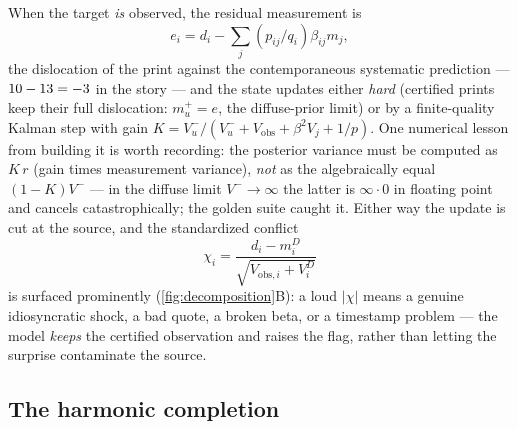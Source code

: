 \documentclass[11pt]{article}
\begin{document}
When the target \emph{is} observed, the residual measurement is
\begin{equation}
e_i=d_i-\textstyle\sum_j (p_{ij}/q_i)\beta_{ij} m_j,
\label{eq:resmeas}
\end{equation}
the dislocation of the print against the contemporaneous systematic
prediction --- $10-13=-3$ in the story --- and the state
updates either \emph{hard} (certified prints keep their full dislocation:
$m_u^+=e$, the diffuse-prior limit) or by a finite-quality Kalman step
with gain $K=V_u^-/(V_u^-+V_{\mathrm{obs}}+\beta^2V_j+1/p)$.  One
numerical lesson from building it is worth recording: the posterior
variance must be computed as $K\,r$ (gain times measurement variance),
\emph{not} as the algebraically equal $(1-K)V^-$ --- in the diffuse limit
$V^-\to\infty$ the latter is $\infty\cdot0$ in floating point and
cancels catastrophically; the golden suite caught it.  Either way the
update is cut at the source, and the standardized conflict
\begin{equation}
\chi_i=\frac{d_i-m^D_i}{\sqrt{V_{\mathrm{obs},i}+V^D_i}}
\label{eq:chi}
\end{equation}
is surfaced prominently (\cref{fig:decomposition}B): a loud $|\chi|$
means a genuine idiosyncratic shock, a bad quote, a broken beta, or a
timestamp problem --- the model \emph{keeps} the certified observation
and raises the flag, rather than letting the surprise contaminate the
source.

\subsection{The harmonic completion}
\label{sec:harmonic}
\end{document}
